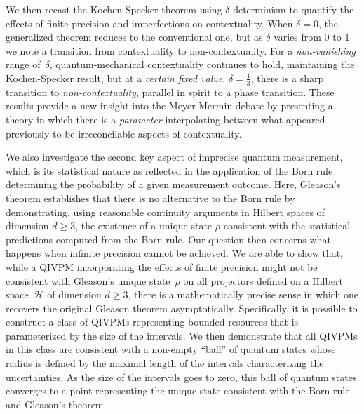 \documentclass[english,reprint, aps, prl,superscriptaddress, showpacs,
showkeys, longbibliography, amsmath, amssymb, floatfix]{revtex4-1}
\theoremstyle{plain}
\theoremstyle{definition}
\newcommand{\Hilb}{\mathcal{H}}
\begin{document}

We then recast the Kochen-Specker theorem using
$\delta$-determinism to quantify the effects of finite precision and
imperfections on contextuality. When $\delta=0$, the generalized
theorem reduces to the conventional one, but as $\delta$ varies from 0
to 1 we note a transition from contextuality to non-contextuality. For
a \emph{non-vanishing} range of~$\delta$, quantum-mechanical
contextuality continues to hold, maintaining the Kochen-Specker
result, but at a \emph{certain fixed value}, $\delta = \frac{1}{3}$,
there is a sharp transition to \emph{non-contextuality}, parallel in
spirit to a phase transition.  These results provide a new insight
into the Meyer-Mermin debate by presenting a theory in which there is
a \emph{parameter} interpolating between what appeared previously to
be irreconcilable aspects of contextuality.

We also investigate the second key aspect of imprecise quantum
measurement, which is its statistical nature as reflected in the
application of the Born rule \cite{Born1983bibTeX,Mermin2007,Jaeger2007} determining the probability of a given
measurement outcome.
Here, Gleason's theorem \cite{gleason1957,Redhead1987-REDINA,peres1995quantum} establishes that there is no alternative to
the Born rule by demonstrating, using reasonable continuity arguments
in Hilbert spaces of dimension $d\ge3$, the existence of a unique
state $\rho$ consistent with the statistical predictions computed from
the Born rule.
Our question then concerns what happens when infinite precision cannot
be achieved.  We are able to show that, while a QIVPM incorporating
the effects of finite precision might not be consistent with Gleason's
unique state~$\rho$ on all projectors defined on a Hilbert
space~$\Hilb$ of dimension $d\ge3$, there is a mathematically precise
sense in which one recovers the original Gleason theorem
asymptotically.  Specifically, it is possible to construct a class of
QIVPMs representing bounded resources that is parameterized by the
size of the intervals. We then demonstrate that all QIVPMs in this
class are consistent with a non-empty ``ball'' of quantum states whose
radius is defined by the maximal length of the intervals
characterizing the uncertainties. As the size of the intervals goes to
zero, this ball of quantum states converges to a point representing
the unique state consistent with the Born rule and Gleason's theorem.
\end{document}
